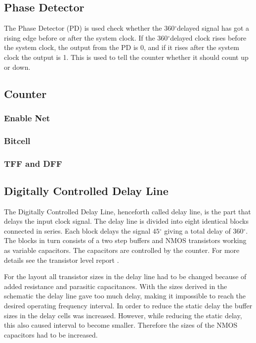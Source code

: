\documentclass[a4paper,12pt]{article} \usepackage{graphicx}
\newcommand{\degree}{\ensuremath{^\circ}}
\begin{document}
\subsection{Phase Detector}
The Phase Detector (PD) is used check whether the 360\degree delayed
signal has got a rising edge before or after the system clock. If the
360\degree delayed clock rises before the system clock, the output
from the PD is 0, and if it rises after the system clock the output is 1.
This is used to tell the counter whether it should count up or down.
\subsection{Counter}
\subsubsection{Enable Net}
\subsubsection{Bitcell}
\subsubsection{TFF and DFF}

\subsection{Digitally Controlled Delay Line}
The Digitally Controlled Delay Line, henceforth called delay line, is the part
that delays the input clock signal. The delay line is divided into eight
identical blocks connected in series. Each block delays the signal $45\degree$
giving a total delay of 360\degree. The blocks in turn consists of a two step
buffers and NMOS transistors working as variable capacitors. The capacitors are
controlled by the counter. For more details see the transistor level report
\cite{transistor}.

For the layout all transistor sizes in the delay line had to be changed because
of added resistance and parasitic capacitances. With the sizes derived in the
schematic the delay line gave too much delay, making it impossible to reach the
desired operating frequency interval. In order to reduce the static delay the
buffer sizes in the delay cells was increased. However, while reducing the
static delay, this also caused interval to become smaller. Therefore the sizes
of the NMOS capacitors had to be increased.
\end{document}
